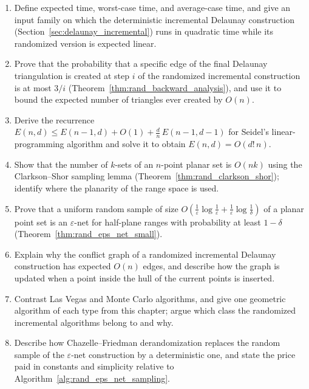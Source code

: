 \begin{enumerate}
  \item Define expected time, worst-case time, and average-case time, and give
    an input family on which the deterministic incremental Delaunay
    construction (Section~\ref{sec:delaunay_incremental}) runs in quadratic time
    while its randomized version is expected linear.
  \item Prove that the probability that a specific edge of the final Delaunay
    triangulation is created at step $i$ of the randomized incremental
    construction is at most $3/i$ (Theorem~\ref{thm:rand_backward_analysis}),
    and use it to bound the expected number of triangles ever created by $O(n)$.
  \item Derive the recurrence $E(n,d) \le E(n-1,d) + O(1) +
    \frac{d}{n}\,E(n-1,d-1)$ for Seidel's linear-programming algorithm and solve
    it to obtain $E(n,d) = O(d!\,n)$.
  \item Show that the number of $k$-sets of an $n$-point planar set is $O(nk)$
    using the Clarkson--Shor sampling lemma
    (Theorem~\ref{thm:rand_clarkson_shor}); identify where the planarity of the
    range space is used.
  \item Prove that a uniform random sample of size $O(\frac{1}{\varepsilon}
    \log\frac{1}{\varepsilon} + \frac{1}{\varepsilon}\log\frac{1}{\delta})$ of a
    planar point set is an $\varepsilon$-net for half-plane ranges with
    probability at least $1 - \delta$ (Theorem~\ref{thm:rand_eps_net_small}).
  \item Explain why the conflict graph of a randomized incremental Delaunay
    construction has expected $O(n)$ edges, and describe how the graph is
    updated when a point inside the hull of the current points is inserted.
  \item Contrast Las Vegas and Monte Carlo algorithms, and give one geometric
    algorithm of each type from this chapter; argue which class the randomized
    incremental algorithms belong to and why.
  \item Describe how Chazelle--Friedman derandomization
    \cite{chazellefriedman1990} replaces the random sample of the
    $\varepsilon$-net construction by a deterministic one, and state the price
    paid in constants and simplicity relative to
    Algorithm~\ref{alg:rand_eps_net_sampling}.
\end{enumerate}
